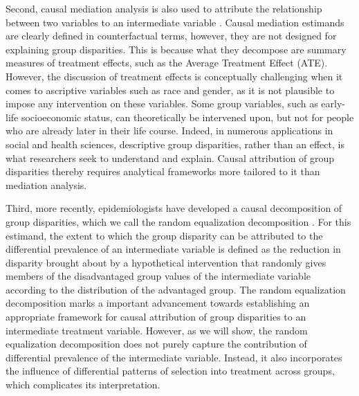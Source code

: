 \documentclass[12pt,a4paper]{article}
\begin{document}
Second, causal mediation analysis is also used to attribute the relationship between two variables to an intermediate variable \citep{vanderweele_explanation_2015}. Causal mediation estimands are clearly defined in counterfactual terms, however, they are not designed for explaining group disparities. This is because what they decompose are summary measures of treatment effects, such as the Average Treatment Effect (ATE). However, the discussion of treatment effects is conceptually challenging when it comes to ascriptive variables such as race and gender, as it is not plausible to impose any intervention on these variables. Some group variables, such as early-life socioeconomic status, can theoretically be intervened upon, but not for people who are already later in their life course. Indeed, in numerous applications in social and health sciences, descriptive group disparities, rather than an effect, is what researchers seek to understand and explain. Causal attribution of group disparities thereby requires analytical frameworks more tailored to it than mediation analysis.  

Third, more recently, epidemiologists have developed a causal decomposition of group disparities, which we call the random equalization decomposition \citep{vanderweele_causal_2014, jackson_decomposition_2018}. For this estimand, the extent to which the group disparity can be attributed to the differential prevalence of an intermediate variable is defined as the reduction in disparity brought about by a hypothetical intervention that randomly gives members of the disadvantaged group values of the intermediate variable according to the distribution of the advantaged group. The random equalization decomposition marks a important advancement towards establishing an appropriate framework for causal attribution of group disparities to an intermediate treatment variable. However, as we will show, the random equalization decomposition does not purely capture the contribution of differential prevalence of the intermediate variable. Instead, it also incorporates the influence of differential patterns of selection into treatment across groups, which complicates its interpretation.
\end{document}
